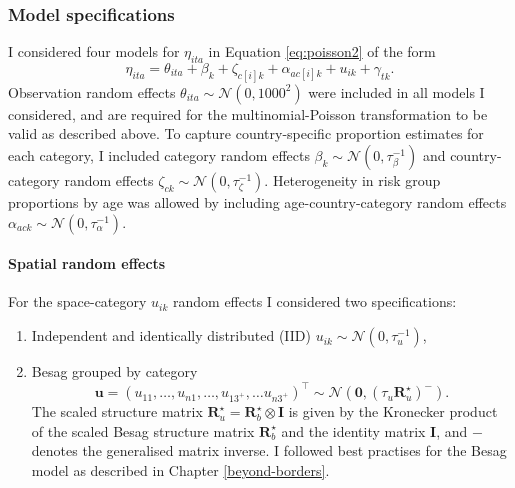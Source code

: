 \documentclass[a4paper, nobind]{templates/ociamthesis}
\providecommand{\tightlist}{%
  \setlength{\itemsep}{0pt}\setlength{\parskip}{0pt}}
\newcommand{\bu}{\mathbf{u}}
\begin{document}
\hypertarget{model-specifications}{%
\subsubsection{Model specifications}\label{model-specifications}}

I considered four models for \(\eta_{ita}\) in Equation \eqref{eq:poisson2} of the form
\begin{equation}
\eta_{ita} = \theta_{ita} + \beta_k + \zeta_{c[i]k} + \alpha_{ac[i]k} + u_{ik} + \gamma_{tk}.
\end{equation}
Observation random effects \(\theta_{ita} \sim \mathcal{N}(0, 1000^2)\) were included in all models I considered, and are required for the multinomial-Poisson transformation to be valid as described above.
To capture country-specific proportion estimates for each category, I included category random effects \(\beta_k \sim \mathcal{N}(0, \tau_\beta^{-1})\) and country-category random effects \(\zeta_{ck} \sim \mathcal{N}(0, \tau_\zeta^{-1})\).
Heterogeneity in risk group proportions by age was allowed by including age-country-category random effects \(\alpha_{ack} \sim \mathcal{N}(0, \tau_\alpha^{-1})\).

\hypertarget{spatial-random-effects}{%
\paragraph{Spatial random effects}\label{spatial-random-effects}}

For the space-category \(u_{ik}\) random effects I considered two specifications:

\begin{enumerate}
\def\labelenumi{\arabic{enumi}.}
\tightlist
\item
  Independent and identically distributed (IID) \(u_{ik} \sim \mathcal{N}(0, \tau_u^{-1})\),
\item
  Besag \autocite{besag1991bayesian} grouped by category
  \[
  \bu = (u_{11}, \ldots, u_{n1}, \ldots, u_{1{3^{+}}}, \ldots u_{n3^{+}})^\top \sim \mathcal{N}(\mathbf{0}, (\tau_u \mathbf{R}^\star_u)^{-}).
  \]
  The scaled structure matrix \(\mathbf{R}^\star_u = \mathbf{R}^\star_b \otimes \mathbf{I}\) is given by the Kronecker product of the scaled Besag structure matrix \(\mathbf{R}^\star_b\) and the identity matrix \(\mathbf{I}\), and \({-}\) denotes the generalised matrix inverse.
  I followed best practises for the Besag model as described in Chapter \ref{beyond-borders}.
\end{enumerate}
\end{document}
